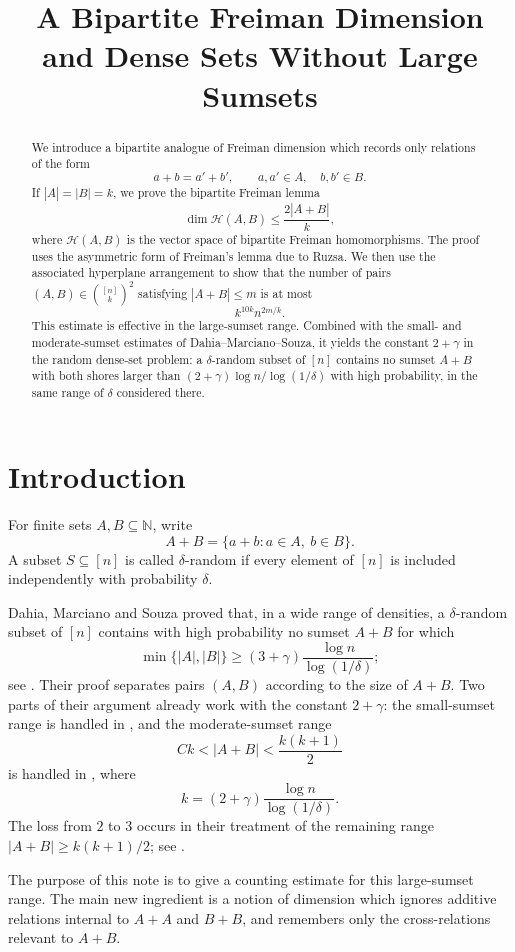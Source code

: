 \documentclass[11pt]{article}
\title{A Bipartite Freiman Dimension and Dense Sets Without Large Sumsets}
\author{}
\date{}
\newcommand{\N}{\mathbb{N}}
\newcommand{\cH}{\mathcal{H}}
\begin{document}
\maketitle

\begin{abstract}
We introduce a bipartite analogue of Freiman dimension which records only relations of the form
\[
 a+b=a'+b',\qquad a,a'\in A,\quad b,b'\in B.
\]
If $|A|=|B|=k$, we prove the bipartite Freiman lemma
\[
 \dim \cH(A,B)\le \frac{2|A+B|}{k},
\]
where $\cH(A,B)$ is the vector space of bipartite Freiman homomorphisms.  The proof uses the asymmetric form of Freiman's lemma due to Ruzsa.  We then use the associated hyperplane arrangement to show that the number of pairs $(A,B)\in\binom{[n]}{k}^2$ satisfying $|A+B|\le m$ is at most
\[
 k^{10k}n^{2m/k}.
\]
This estimate is effective in the large-sumset range.  Combined with the small- and moderate-sumset estimates of Dahia--Marciano--Souza, it yields the constant $2+\gamma$ in the random dense-set problem: a $\delta$-random subset of $[n]$ contains no sumset $A+B$ with both shores larger than $(2+\gamma)\log n/\log(1/\delta)$ with high probability, in the same range of $\delta$ considered there.
\end{abstract}

\section{Introduction}

For finite sets $A,B\subseteq\N$, write
\[
 A+B=\{a+b:a\in A,\ b\in B\}.
\]
A subset $S\subseteq[n]$ is called $\delta$-random if every element of $[n]$ is included independently with probability $\delta$.

Dahia, Marciano and Souza proved that, in a wide range of densities, a $\delta$-random subset of $[n]$ contains with high probability no sumset $A+B$ for which
\[
 \min\{|A|,|B|\}\ge (3+\gamma)\frac{\log n}{\log(1/\delta)};
\]
see \cite[Theorem 1.3]{DMS}.  Their proof separates pairs $(A,B)$ according to the size of $A+B$.  Two parts of their argument already work with the constant $2+\gamma$: the small-sumset range is handled in \cite[Lemma 2.1]{DMS}, and the moderate-sumset range
\[
 Ck<|A+B|<\frac{k(k+1)}2
\]
is handled in \cite[Corollary 3.3]{DMS}, where
\[
 k=(2+\gamma)\frac{\log n}{\log(1/\delta)}.
\]
The loss from $2$ to $3$ occurs in their treatment of the remaining range $|A+B|\ge k(k+1)/2$; see \cite[Lemma 4.1]{DMS}.

The purpose of this note is to give a counting estimate for this large-sumset range.  The main new ingredient is a notion of dimension which ignores additive relations internal to $A+A$ and $B+B$, and remembers only the cross-relations relevant to $A+B$.
\end{document}
